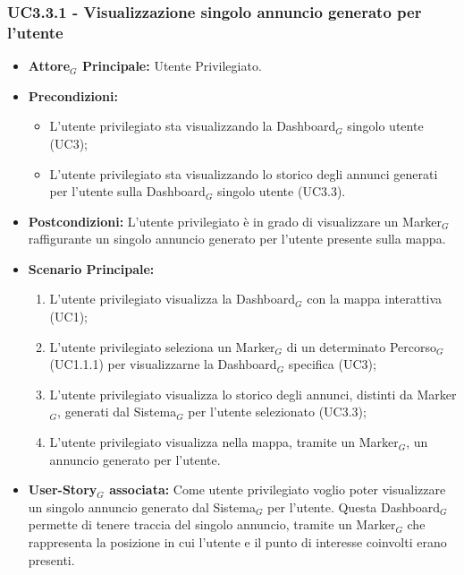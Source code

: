 \documentclass[10pt]{article}
\begin{document}
\begin{justify}
\subsubsection{\textbf{UC3.3.1 - Visualizzazione singolo annuncio generato per l'utente}}
\label{UC3.3.1}
\begin{itemize}
     \item \textbf{Attore$_G$ Principale:} Utente Privilegiato.
     \item \textbf{Precondizioni:}
        \begin{itemize}
    		\item L'utente privilegiato sta visualizzando la Dashboard$_G$ singolo utente (UC3);
    		\item L'utente privilegiato sta visualizzando lo storico degli annunci generati per l'utente sulla Dashboard$_G$ singolo utente (UC3.3).
        \end{itemize}
     \item \textbf{Postcondizioni:} L'utente privilegiato è in grado di visualizzare un Marker$_G$ raffigurante un singolo annuncio generato per l'utente presente sulla mappa.
     \item \textbf{Scenario Principale:}
        \begin{enumerate}
            \item L'utente privilegiato visualizza la Dashboard$_G$ con la mappa interattiva (UC1);
            \item L'utente privilegiato seleziona un Marker$_G$ di un determinato Percorso$_G$ (UC1.1.1) per visualizzarne la Dashboard$_G$ specifica (UC3);
            \item L'utente privilegiato visualizza lo storico degli annunci, distinti da Marker$_G$, generati dal Sistema$_G$ per l'utente selezionato (UC3.3);
            \item L'utente privilegiato visualizza nella mappa, tramite un Marker$_G$, un annuncio generato per l'utente.
        \end{enumerate}
     \item \textbf{User-Story$_G$ associata:}
     Come utente privilegiato voglio poter visualizzare un singolo annuncio generato dal Sistema$_G$ per l'utente. Questa Dashboard$_G$ permette di tenere traccia del singolo annuncio, tramite un Marker$_G$ che rappresenta la posizione in cui l'utente e il punto di interesse coinvolti erano presenti.
\end{itemize}


\end{justify}
\end{document}
